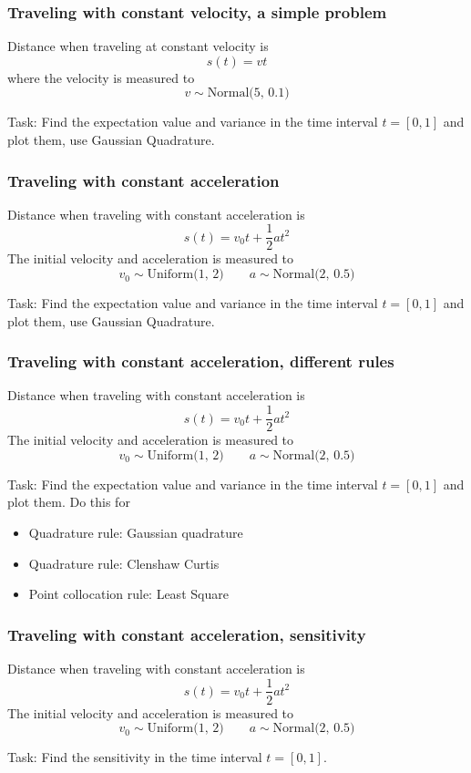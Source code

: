 \documentclass{beamer}
\begin{document}
\begin{frame}
\frametitle{Traveling with constant velocity, a simple problem}
 Distance when traveling at constant velocity is
\[s(t) = vt\]
\pause
where the velocity is measured to
\[v \sim \text{Normal(5, 0.1)}\]
\pause
\begin{alert}{Task:}
 Find the expectation value and variance in the time interval $t=[0,1]$  and plot them, use Gaussian Quadrature.
\end{alert}

\end{frame}

\begin{frame}
\frametitle{Traveling with constant acceleration}
 Distance when traveling with constant acceleration is
 \[s(t) = v_0t + \frac{1}{2}at^2\]
\pause
The initial velocity and acceleration is measured to
\[v_0 \sim \text{Uniform(1, 2)} \qquad a \sim \text{Normal(2, 0.5)}\]
\pause
\begin{alert}{Task:}
Find the expectation value and variance in the time interval $t=[0,1]$  and plot them, use Gaussian Quadrature.
\end{alert}
\end{frame}


\begin{frame}
\frametitle{Traveling with constant acceleration, different rules}
 Distance when traveling with constant acceleration is
 \[s(t) = v_0t + \frac{1}{2}at^2\]
The initial velocity and acceleration is measured to
\[v_0 \sim \text{Uniform(1, 2)} \qquad a \sim \text{Normal(2, 0.5)}\]
\begin{alert}{Task:}
 Find the expectation value and variance in the time interval $t=[0,1]$ and plot them. Do this for 
 \begin{itemize}
  \item Quadrature rule: Gaussian quadrature
  \item Quadrature rule: Clenshaw Curtis
  \item Point collocation rule: Least Square
 \end{itemize}
\end{alert}
\end{frame}

\begin{frame}
\frametitle{Traveling with constant acceleration, sensitivity}
 Distance when traveling with constant acceleration is
 \[s(t) = v_0t + \frac{1}{2}at^2\]
The initial velocity and acceleration is measured to
\[v_0 \sim \text{Uniform(1, 2)} \qquad a \sim \text{Normal(2, 0.5)}\]
\begin{alert}{Task:}
 Find the sensitivity in the time interval $t=[0,1]$.
\end{alert}
\end{frame}
\end{document}
